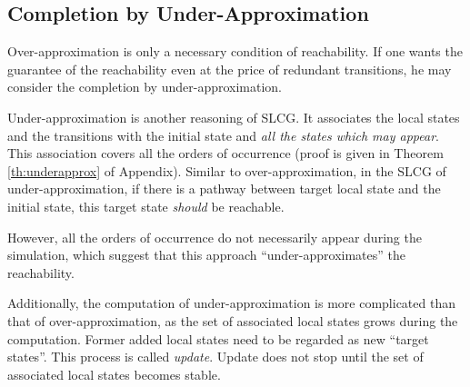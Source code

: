 \subsection{Completion by Under-Approximation}\label{sec:completionUnder}
Over-approximation is only a necessary condition of reachability.
If one wants the guarantee of the reachability even at the price of redundant transitions, he may consider the completion by under-approximation.

Under-approximation is another reasoning of SLCG. 
It associates the local states and the transitions with the initial state and \textit{all the states which may appear}.
This association covers all the orders of occurrence (proof is given in Theorem \ref{th:underapprox} of Appendix).
Similar to over-approximation, in the SLCG of under-approximation, if there is a pathway between target local state and the initial state, this target state \textit{should} be reachable.

However, all the orders of occurrence do not necessarily appear during the simulation, which suggest that this approach ``under-approximates'' the reachability.

Additionally, the computation of under-approximation is more complicated than that of over-approximation, as the set of associated local states grows during the computation.
Former added local states need to be regarded as new ``target states''.
This process is called \textit{update}. 
Update does not stop until the set of associated local states becomes stable.


